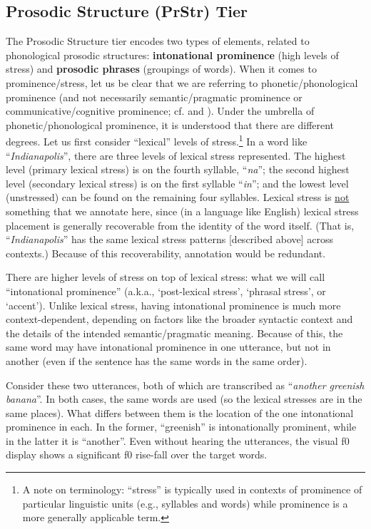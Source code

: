 \documentclass[11pt, twoside]{memoir}
\def\langtext#1{\textit{#1}}
\begin{document}
\subsection{Prosodic Structure (PrStr) Tier}\label{sec:prosodic-structure-prstr}

The Prosodic Structure tier encodes two types of elements, related to phonological prosodic structures: \textbf{intonational prominence} (high levels of stress) and \textbf{prosodic phrases} (groupings of words). When it comes to prominence\slash stress, let us be clear that we are referring to phonetic\slash phonological prominence (and not necessarily semantic\slash pragmatic prominence or communicative\slash cognitive prominence; cf. \citealt{gussenhoven15} and \citealt{wagner-15}). Under the umbrella of phonetic\slash phonological prominence, it is understood that there are different degrees. Let us first consider “lexical” levels of stress.\footnote{A note on terminology: “stress” is typically used in contexts of prominence of particular linguistic units (e.g., syllables and words) while prominence is a more generally applicable term.} In a word like “\langtext{Indianapolis}”, there are three levels of lexical stress represented. The highest level (primary lexical stress) is on the fourth syllable, “\langtext{na}”; the second highest level (secondary lexical stress) is on the first syllable “\langtext{in}”; and the lowest level (unstressed) can be found on the remaining four syllables. Lexical stress is \uline{not} something that we annotate here, since (in a language like English) lexical stress placement is generally recoverable from the identity of the word itself. (That is, “\langtext{Indianapolis}” has the same lexical stress patterns [described above] across contexts.) Because of this recoverability, annotation would be redundant.

There are higher levels of stress on top of lexical stress: what we will call “intonational prominence” (a.k.a., ‘post-lexical stress’, ‘phrasal stress’, or ‘accent’). Unlike lexical stress, having intonational prominence is much more context-dependent, depending on factors like the broader syntactic context and the details of the intended semantic\slash pragmatic meaning. Because of this, the same word may have intonational prominence in one utterance, but not in another (even if the sentence has the same words in the same order).

Consider these two utterances, both of which are transcribed as “\langtext{another greenish banana}”. In both cases, the same words are used (so the lexical stresses are in the same places). What differs between them is the location of the one intonational prominence in each. In the former, “greenish” is intonationally prominent, while in the latter it is “another”. Even without hearing the utterances, the visual f0 display shows a significant f0 rise-fall over the target words. 
\end{document}
